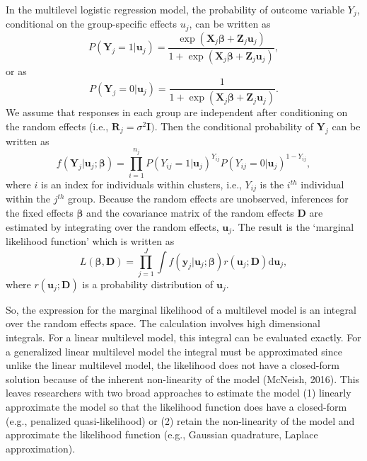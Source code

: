 \documentclass[12pt,oneside,a4paper]{reedthesis}
\begin{document}
In the multilevel logistic regression model, the probability of outcome variable \({Y}_{j}\), conditional on the group-specific effects \({u}_{j}\), can be written as
\begin{equation}
P\left(\mathbf{Y}_{j}=1 | \mathbf{u}_{j}\right)=\frac{\exp \left(\mathbf{X}_{j} \boldsymbol{\beta}+\mathbf{Z}_{j} \mathbf{u}_{j}\right)}{1+\exp \left(\mathbf{X}_{j} \mathbf{\beta}+\mathbf{Z}_{j} \mathbf{u}_{j}\right)},
\end{equation}
or as
\begin{equation}
P\left(\mathbf{Y}_{j}=0 | \mathbf{u}_{j}\right)=\frac{1}{1+\exp \left(\mathbf{X}_{j} \boldsymbol{\beta}+\mathbf{Z}_{j} \mathbf{u}_{j}\right)}.
\end{equation}
We assume that responses in each group are independent after conditioning on the random effects (i.e., \(\mathbf{R}_{j}=\sigma^{2} \mathbf{I} )\). Then the conditional probability of \(\mathbf{Y}_{j}\) can be written as
\begin{equation}
f\left(\mathbf{Y}_{j} | \mathbf{u}_{j} ; \boldsymbol{\beta}\right)=\prod_{i=1}^{n_{j}} P\left(Y_{i j}=1 | \mathbf{u}_{j}\right)^{Y_{i j}} P\left(Y_{i j}=0 | \mathbf{u}_{j}\right)^{1-Y_{i j}},
\end{equation}
where \(i\) is an index for individuals within clusters, i.e., \(Y_{ij}\) is the \(i^{th}\) individual within the \(j^{th}\) group.
Because the random effects are unobserved, inferences for the fixed effects \(\boldsymbol{\beta}\) and the covariance matrix of the random effects \(\mathbf{D}\) are estimated by integrating over the random effects, \(\mathbf{u}_{j} .\) The result is the `marginal likelihood function' which is written as
\begin{equation}
L(\boldsymbol{\beta}, \mathbf{D})=\prod_{j=1}^{J} \int f\left(\mathbf{y}_{j} | \mathbf{u}_{j} ; \boldsymbol{\beta}\right) r\left(\mathbf{u}_{j} ; \mathbf{D}\right) \mathrm{d} \mathbf{u}_{j},
\label{eq:likelihood}
\end{equation}
where \(r\left(\mathbf{u}_{j} ; \mathbf{D}\right)\) is a probability distribution of \(\mathbf{u}_{j}\).

So, the expression for the marginal likelihood of a multilevel model is an integral over the random effects space. The calculation involves high dimensional integrals. For a linear multilevel model, this integral can be evaluated exactly. For a generalized linear multilevel model the integral must be approximated since unlike the linear multilevel model, the likelihood does not have a closed-form solution because of the inherent non-linearity of the model (McNeish, 2016).
This leaves researchers with two broad approaches to estimate the model
(1) linearly approximate the model so that the likelihood function does have a closed-form (e.g., penalized quasi-likelihood) or (2) retain the non-linearity of the model and approximate the likelihood function (e.g., Gaussian quadrature, Laplace approximation).
\end{document}

